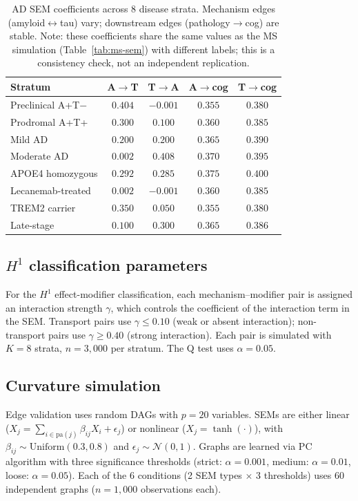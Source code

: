 \documentclass[11pt]{article}
\begin{document}
\begin{table}[h]
\centering
\caption{AD SEM coefficients across 8 disease strata. Mechanism edges (amyloid$\leftrightarrow$tau) vary; downstream edges (pathology$\to$cog) are stable. Note: these coefficients share the same values as the MS simulation (Table~\ref{tab:ms-sem}) with different labels; this is a consistency check, not an independent replication.}
\label{tab:ad-sem}
\small
\begin{tabular}{@{}lcccc@{}}
\toprule
\textbf{Stratum} & \textbf{A$\to$T} & \textbf{T$\to$A} & \textbf{A$\to$cog} & \textbf{T$\to$cog} \\
\midrule
Preclinical A+T$-$ & $0.404$ & $-0.001$ & $0.355$ & $0.380$ \\
Prodromal A+T+ & $0.300$ & $0.100$ & $0.360$ & $0.385$ \\
Mild AD & $0.200$ & $0.200$ & $0.365$ & $0.390$ \\
Moderate AD & $0.002$ & $0.408$ & $0.370$ & $0.395$ \\
APOE4 homozygous & $0.292$ & $0.285$ & $0.375$ & $0.400$ \\
Lecanemab-treated & $0.002$ & $-0.001$ & $0.360$ & $0.385$ \\
TREM2 carrier & $0.350$ & $0.050$ & $0.355$ & $0.380$ \\
Late-stage & $0.100$ & $0.300$ & $0.365$ & $0.386$ \\
\bottomrule
\end{tabular}
\end{table}

\subsection{$H^1$ classification parameters}

For the $H^1$ effect-modifier classification, each mechanism--modifier pair is assigned an interaction strength $\gamma$, which controls the coefficient of the interaction term in the SEM. Transport pairs use $\gamma \leq 0.10$ (weak or absent interaction); non-transport pairs use $\gamma \geq 0.40$ (strong interaction). Each pair is simulated with $K = 8$ strata, $n = 3{,}000$ per stratum. The Q test uses $\alpha = 0.05$.

\subsection{Curvature simulation}

Edge validation uses random DAGs with $p = 20$ variables. SEMs are either linear ($X_j = \sum_{i \in \mathrm{pa}(j)} \beta_{ij} X_i + \epsilon_j$) or nonlinear ($X_j = \tanh(\cdot)$), with $\beta_{ij} \sim \mathrm{Uniform}(0.3, 0.8)$ and $\epsilon_j \sim \mathcal{N}(0, 1)$. Graphs are learned via PC algorithm with three significance thresholds (strict: $\alpha = 0.001$, medium: $\alpha = 0.01$, loose: $\alpha = 0.05$). Each of the 6 conditions (2 SEM types $\times$ 3 thresholds) uses 60 independent graphs ($n = 1{,}000$ observations each).
\end{document}
